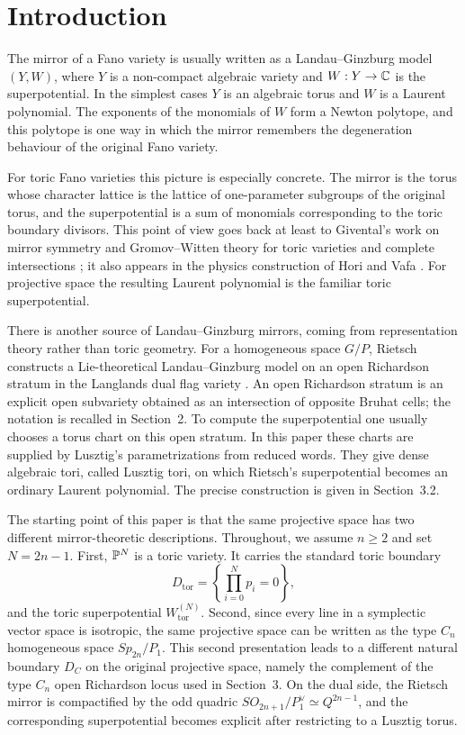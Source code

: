 \section{Introduction}

The mirror of a Fano variety is usually written as a Landau--Ginzburg model \((Y,W)\), where \(Y\) is a non-compact algebraic variety and \(W:Y\to\mathbb{C}\) is the superpotential. In the simplest cases \(Y\) is an algebraic torus and \(W\) is a Laurent polynomial. The exponents of the monomials of \(W\) form a Newton polytope, and this polytope is one way in which the mirror remembers the degeneration behaviour of the original Fano variety.

For toric Fano varieties this picture is especially concrete. The mirror is the torus whose character lattice is the lattice of one-parameter subgroups of the original torus, and the superpotential is a sum of monomials corresponding to the toric boundary divisors. This point of view goes back at least to Givental's work on mirror symmetry and Gromov--Witten theory for toric varieties and complete intersections \cite{Givental,Givental98}; it also appears in the physics construction of Hori and Vafa \cite{HV}. For projective space the resulting Laurent polynomial is the familiar toric superpotential.

There is another source of Landau--Ginzburg mirrors, coming from representation theory rather than toric geometry. For a homogeneous space \(G/P\), Rietsch constructs a Lie-theoretical Landau--Ginzburg model on an open Richardson stratum in the Langlands dual flag variety \cite{Rietsch}. An open Richardson stratum is an explicit open subvariety obtained as an intersection of opposite Bruhat cells; the notation is recalled in Section~2. To compute the superpotential one usually chooses a torus chart on this open stratum. In this paper these charts are supplied by Lusztig's parametrizations from reduced words. They give dense algebraic tori, called Lusztig tori, on which Rietsch's superpotential becomes an ordinary Laurent polynomial. The precise construction is given in Section~3.2.

The starting point of this paper is that the same projective space has two different mirror-theoretic descriptions. Throughout, we assume \(n\ge2\) and set \(N=2n-1\). First, \(\mathbb{P}^N\) is a toric variety. It carries the standard toric boundary
\[
D_{\mathrm{tor}}=\left\{\prod_{i=0}^Np_i=0\right\},
\]
and the toric superpotential \(W_{\mathrm{tor}}^{(N)}\). Second, since every line in a symplectic vector space is isotropic, the same projective space can be written as the type \(C_n\) homogeneous space \(Sp_{2n}/P_1\). This second presentation leads to a different natural boundary \(D_C\) on the original projective space, namely the complement of the type \(C_n\) open Richardson locus used in Section~3. On the dual side, the Rietsch mirror is compactified by the odd quadric \(SO_{2n+1}/P_1^\vee\simeq Q^{2n-1}\), and the corresponding superpotential becomes explicit after restricting to a Lusztig torus.

